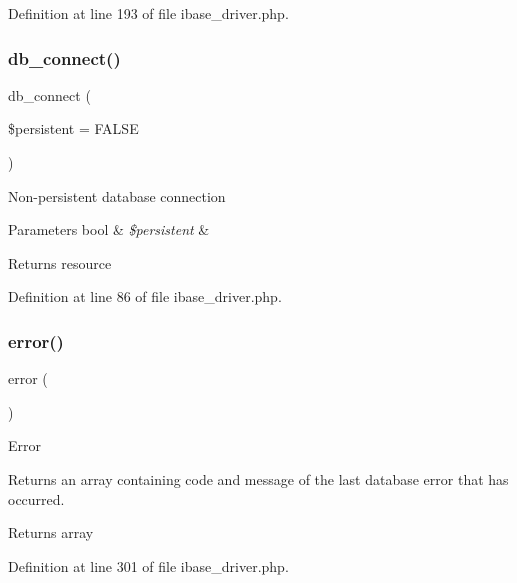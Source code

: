 Definition at line 193 of file ibase\+\_\+driver.\+php.

\mbox{\label{class_c_i___d_b__ibase__driver_a52bf595e79e96cc0a7c907a9b45aeb4d}} 
\subsubsection{\texorpdfstring{db\_connect()}{db\_connect()}}
{\footnotesize\ttfamily db\+\_\+connect (\begin{DoxyParamCaption}\item[{}]{\$persistent = {\ttfamily FALSE} }\end{DoxyParamCaption})}

Non-\/persistent database connection


\begin{DoxyParams}[1]{Parameters}
bool & {\em \$persistent} & \\
\hline
\end{DoxyParams}
\begin{DoxyReturn}{Returns}
resource 
\end{DoxyReturn}


Definition at line 86 of file ibase\+\_\+driver.\+php.

\mbox{\label{class_c_i___d_b__ibase__driver_a43b8d30b879d4f09ceb059b02af2bc02}} 
\subsubsection{\texorpdfstring{error()}{error()}}
{\footnotesize\ttfamily error (\begin{DoxyParamCaption}{ }\end{DoxyParamCaption})}

Error

Returns an array containing code and message of the last database error that has occurred.

\begin{DoxyReturn}{Returns}
array 
\end{DoxyReturn}


Definition at line 301 of file ibase\+\_\+driver.\+php.


